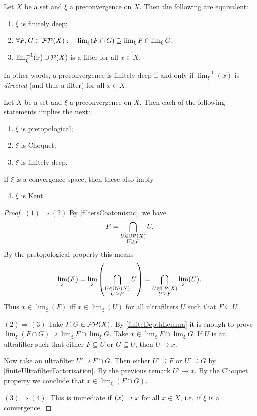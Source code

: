 \begin{lemma} \label{finiteDepthLemma}
Let $X$ be a set and $\xi$ a preconvergence on $X$. Then the following are equivalent:
\begin{enumerate}
\item $\xi$ is finitely deep;
\item $\forall F,G \in \operatorname{\mathcal{FP}}(X): \quad \lim_\xi(F\cap G) \supseteq \lim_\xi F \cap \lim_\xi G$;
\item $\lim_\xi^{-1}(x)\cup \operatorname{\mathcal{P}}(X)$ is a filter for all $x\in X$.
\end{enumerate}
\end{lemma}
In other words, a preconvergence is finitely deep \textup{if and only if} $\lim_\xi^{-1}(x)$ is \emph{directed} (and thus a filter) for all $x\in X$.

\begin{proposition} \label{depthImplications}
Let $X$ be a set and $\xi$ a preconvergence on $X$. Then each of the following statements implies the next:
\begin{enumerate}
\item $\xi$ is pretopological;
\item $\xi$ is Choquet;
\item $\xi$ is finitely deep.
\end{enumerate}
If $\xi$ is a convergence space, then these also imply
\begin{enumerate} \setcounter{enumi}{3}
\item $\xi$ is Kent.
\end{enumerate}
\end{proposition}
\begin{proof}
$(1) \Rightarrow (2)$ By \ref{filtersCoatomistic}, we have
\[ F = \bigcap_{\substack{U\in \operatorname{\mathbb{U}\mathcal{P}}(X) \\ U\geq F}} U. \]
By the pretopological property this means
\[ \lim_\xi(F) = \lim_\xi\left(\bigcap_{\substack{U\in \operatorname{\mathbb{U}\mathcal{P}}(X) \\ U\geq F}} U\right) = \bigcap_{\substack{U\in \operatorname{\mathbb{U}\mathcal{P}}(X) \\ U\geq F}} \lim_\xi(U). \]
Thus $x\in \lim_\xi(F)$ iff $x\in \lim_\xi(U)$ for all ultrafilters $U$ such that $F\subseteq U$.

$(2) \Rightarrow (3)$ Take $F,G\in\operatorname{\mathcal{FP}}(X)$. By \ref{finiteDepthLemma} it is enough to prove $\lim_\xi(F\cap G) \supseteq \lim_\xi F \cap \lim_\xi G$. Take $x\in \lim_\xi F \cap \lim_\xi G$. If $U$ is an ultrafilter such that either $F\subseteq U$ or $G\subseteq U$, then $U\to x$.

Now take an ultrafilter $U' \supseteq F\cap G$. Then either $U'\supseteq F$ or $U'\supseteq G$ by \ref{finiteUltrafilterFactorisation}. By the previous remark $U'\to x$. By the Choquet property we conclude that $x\in \lim_\xi(F\cap G)$.

$(3) \Rightarrow (4)$. This is immediate if $\dot(x) \to x$ for all $x\in X$, i.e.\ if $\xi$ is a convergence.
\end{proof}


